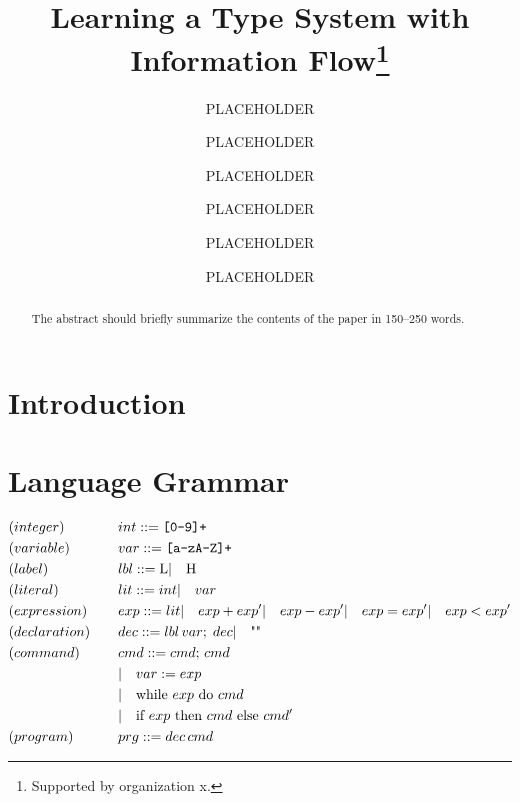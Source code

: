\documentclass[runningheads]{llncs}
\newcommand{\mI}{\hspace{0.5em | \hspace{0.5em}} }
\begin{document}
%
\title{Learning a Type System with Information Flow\thanks{Supported by organization x.}}
%
%
\author{PLACEHOLDER \and PLACEHOLDER \and PLACEHOLDER \and PLACEHOLDER \and PLACEHOLDER \and PLACEHOLDER}
%
%
%
\maketitle              %
%
\begin{abstract}
The abstract should briefly summarize the contents of the paper in
150--250 words.

\end{abstract}
%
%
%
\section{Introduction}

\section{Language Grammar}
\begin{alignat*}{3}
&(integer)      \quad &&int ::= \verb/[0-9]+/\\
&(variable)     \quad &&var ::= \verb/[a-zA-Z]+/\\
&(label)        \quad &&lbl ::= \text{L} \mI \text{H}\\
&(literal)      \quad &&lit ::= int \mI var\\
&(expression)   \quad &&exp ::= lit \mI exp + exp' \mI exp - exp' \mI exp = exp' \mI exp < exp'\\
&(declaration)  \quad &&dec ::= lbl \, var; \; dec \mI \text{""}\\
&(command)      \quad &&cmd ::= cmd; \, cmd\\
&&& \mI  var := exp\\
&&& \mI  \text{while $exp$ do $cmd$}\\
&&& \mI  \text{if $exp$ then $cmd$ else $cmd'$}\\
&(program)      \quad &&prg ::= dec \, cmd
\end{alignat*}
\end{document}
